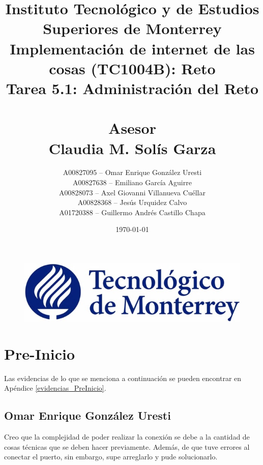 \documentclass[12pt]{article}
\begin{document}
\title{\LARGE{Instituto Tecnológico y de Estudios Superiores
de Monterrey}\\
	\large{Implementación de internet de las cosas (TC1004B): Reto}\\
	\Large{Tarea 5.1: Administración del Reto}\\
	\, \\
	\large{Asesor\\
	Claudia M. Solís Garza}}
\author{
A00827095 -- Omar Enrique González Uresti\\
A00827638 -- Emiliano García Aguirre\\
A00828073 -- Axel Giovanni Villanueva Cuéllar\\
A00828368 -- Jesús Urquidez Calvo\\
A01720388 -- Guillermo Andrés Castillo Chapa
}
\date{\today}
\maketitle
{}

\begin{figure}[!t]
\centering
\includegraphics[width = \textwidth]{logo}
\end{figure}

\newpage

\tableofcontents
\newpage


\section{Pre-Inicio}
Las evidencias de lo que se menciona a continuación se
pueden encontrar en Apéndice \ref{evidencias_PreInicio}.

\subsection{Omar Enrique González Uresti}
Creo que la complejidad de poder realizar la conexión se
debe a la cantidad de cosas técnicas que se deben hacer
previamente. Además, de que tuve errores al conectar el
puerto, sin embargo, supe arreglarlo y pude solucionarlo.
\end{document}
